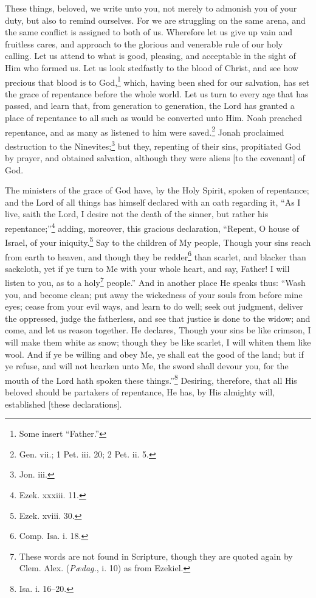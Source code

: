 
These things, beloved, we write unto you, not merely to admonish you of your duty, but also to remind ourselves. For we are struggling on the same arena, and the same conflict is assigned to both of us. Wherefore let us give up vain and fruitless cares, and approach to the glorious and venerable rule of our holy calling. Let us attend to what is good, pleasing, and acceptable in the sight of Him who formed us. Let us look stedfastly to the blood of Christ, and see how precious that blood is to God,\footnote{Some insert “Father.”} which, having been shed for our salvation, has set the grace of repentance before the whole world. Let us turn to every age that has passed, and learn that, from generation to generation, the Lord has granted a place of repentance to all such as would be converted unto Him. Noah preached repentance, and as many as listened to him were saved.\footnote{Gen. vii.; 1 Pet. iii. 20; 2 Pet. ii. 5.} Jonah proclaimed destruction to the Ninevites;\footnote{Jon. iii.} but they, repenting of their sins, propitiated God by prayer, and obtained salvation, although they were aliens [to the covenant] of God.


The ministers of the grace of God have, by the Holy Spirit, spoken of repentance; and the Lord of all things has himself declared with an oath regarding it, “As I live, saith the Lord, I desire not the death of the sinner, but rather his repentance;”\footnote{Ezek. xxxiii. 11.} adding, moreover, this gracious declaration, “Repent, O house of Israel, of your iniquity.\footnote{Ezek. xviii. 30.} Say to the children of My people, Though your sins reach from earth to heaven, and though they be redder\footnote{Comp. Isa. i. 18.} than scarlet, and blacker than sackcloth, yet if ye turn to Me with your whole heart, and say, Father! I will listen to you, as to a holy\footnote{These words are not found in Scripture, though they are quoted again by Clem. Alex. (\emph{Pædag.}, i. 10) as from Ezekiel.} people.” And in another place He speaks thus: “Wash you, and become clean; put away the wickedness of your souls from before mine eyes; cease from your evil ways, and learn to do well; seek out judgment, deliver the oppressed, judge the fatherless, and see that justice is done to the widow; and come, and let us reason together. He declares, Though your sins be like crimson, I will make them white as snow; though they be like scarlet, I will whiten them like wool. And if ye be willing and obey Me, ye shall eat the good of the land; but if ye refuse, and will not hearken unto Me, the sword shall devour you, for the mouth of the Lord hath spoken these things.”\footnote{Isa. i. 16–20.} Desiring, therefore, that all His beloved should be partakers of repentance, He has, by His almighty will, established [these declarations].

